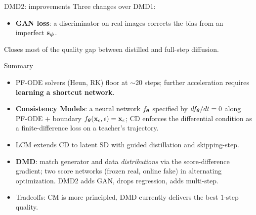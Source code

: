 \documentclass{beamer}
\begin{document}
\begin{frame}{DMD2: improvements}
	Three changes over DMD1:
	\eqpause
	\begin{itemize}
		\item \textbf{GAN loss}: a discriminator on real images corrects the bias from an imperfect $\mathbf{s}_{\boldsymbol{\psi}}$.
	\end{itemize}
	\eqpause
	Closes most of the quality gap between distilled and full-step diffusion.
\end{frame}
\begin{frame}{Summary}
	\begin{itemize}
		\item PF-ODE solvers (Heun, RK) floor at ${\sim}20$ steps; further acceleration requires \textbf{learning a shortcut network}.
		\item \textbf{Consistency Models}: a neural network $f_{\boldsymbol{\theta}}$ specified by $df_{\boldsymbol{\theta}}/dt = 0$ along PF-ODE $+$ boundary $f_{\boldsymbol{\theta}}(\mathbf{x}_{\epsilon}, \epsilon) = \mathbf{x}_{\epsilon}$; CD enforces the differential condition as a finite-difference loss on a teacher's trajectory.
		\item LCM extends CD to latent SD with guided distillation and skipping-step.
		\item \textbf{DMD}: match generator and data \emph{distributions} via the score-difference gradient; two score networks (frozen real, online fake) in alternating optimization. DMD2 adds GAN, drops regression, adds multi-step.
		\item Tradeoffs: CM is more principled, DMD currently delivers the best $1$-step quality.
	\end{itemize}
\end{frame}
\end{document}
